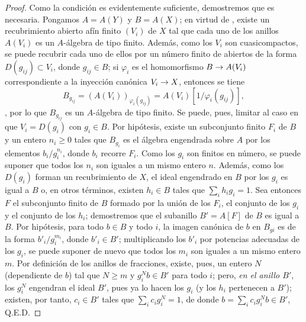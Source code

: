 \documentclass[oneside]{amsart}
\theoremstyle{ega-env-style}
\theoremstyle{ega-thm-env-style}
\theoremstyle{ega-defn-env-style}
\def\geq{\geqslant}                 %
\renewcommand{\to}{\mathchoice{\longrightarrow}{\rightarrow}{\rightarrow}{\rightarrow}}
\begin{document}
\begin{proof}
Como la condición es evidentemente suficiente, demostremos que es necesaria.
Pongamos $A=A(Y)$ y $B=A(X)$;
en virtud de , existe un recubrimiento abierto afín finito $(V_i)$ de $X$ tal que cada uno de los anillos $A(V_i)$ es un $A$-álgebra de tipo finito.
Además, como los $V_i$ son cuasicompactos, se puede recubrir cada uno de ellos por un número finito de abiertos de la forma $D(g_{ij})\subset V_i$, donde $g_{ij}\in B$;
si $\varphi_i$ es el homomorfismo $B\to A(V_i)$ correspondiente a la inyección canónica $V_i\to X$, entonces se tiene \[
  B_{g_{ij}}=(A(V_i))_{\varphi_i(g_{ij})}
  =A(V_i)[1/\varphi_i(g_{ij})],
\], por lo que $B_{g_{ij}}$ es un $A$-álgebra de tipo finito.
Se puede, pues, limitar al caso en que $V_i=D(g_i)$ con $g_i\in B$.
Por hipótesis, existe un subconjunto finito $F_i$ de $B$ y un entero $n_i\geq 0$ tales que $B_{g_i}$ es el álgebra engendrada sobre $A$ por los elementos $b_i/g_i^{n_i}$, donde $b_i$ recorre $F_i$.
Como los $g_i$ son finitos en número, se puede suponer que todos los $n_i$ son iguales a un mismo entero $n$.
Además, como los $D(g_i)$ forman un recubrimiento de $X$, el ideal engendrado en $B$ por los $g_i$ es igual a $B$ o, en otros términos, existen $h_i\in B$ tales que $\sum_i h_i g_i=1$.
Sea entonces $F$ el subconjunto finito de $B$ formado por la unión de los $F_i$, el conjunto de los $g_i$ y el conjunto de los $h_i$; demostremos que el subanillo $B'=A[F]$ de $B$ es igual a $B$.
Por hipótesis, para todo $b\in B$ y todo $i$, la imagen canónica de $b$ en $B_{gi}$ es de la forma $b'_i/g_i^{m_i}$, donde $b'_i\in B'$;
multiplicando los $b'_i$ por potencias adecuadas de los $g_i$, se puede suponer de nuevo que todos los $m_i$ son iguales a un mismo entero $m$.
Por definición de los anillos de fracciones, existe, pues, un entero $N$ (dependiente de $b$) tal que $N\geq m$ y $g_i^N b\in B'$ para todo $i$;
pero, \emph{en el anillo $B'$}, los $g_i^N$ engendran el ideal $B'$, pues ya lo hacen los $g_i$ (y los $h_i$ pertenecen a $B'$);
existen, por tanto, $c_i\in B'$ tales que $\sum_i c_i g_i^N=1$, de donde $b=\sum_i c_i g_i^N b\in B'$, Q.E.D.
\end{proof}
\end{document}
